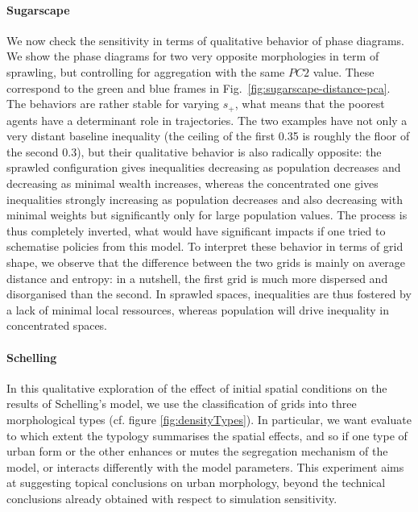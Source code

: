 \documentclass[Royal,sageh,times]{sagej}
\begin{document}
\paragraph{Sugarscape} We now check the sensitivity in terms of qualitative behavior of phase diagrams. We show the phase diagrams for two very opposite morphologies in term of sprawling, but controlling for aggregation with the same $PC2$ value. These correspond to the green and blue frames in Fig.~\ref{fig:sugarscape-distance-pca}. The behaviors are rather stable for varying $s_+$, what means that the poorest agents have a determinant role in trajectories. The two examples have not only a very distant baseline inequality (the ceiling of the first 0.35 is roughly the floor of the second 0.3), but their qualitative behavior is also radically opposite: the sprawled configuration gives inequalities decreasing as population decreases and decreasing as minimal wealth increases, whereas the concentrated one gives inequalities strongly increasing as population decreases and also decreasing with minimal weights but significantly only for large population values. The process is thus completely inverted, what would have significant impacts if one tried to schematise policies from this model. To interpret these behavior in terms of grid shape, we observe that the difference between the two grids is mainly on average distance and entropy: in a nutshell, the first grid is much more dispersed and disorganised than the second. In sprawled spaces, inequalities are thus fostered by a lack of minimal local ressources, whereas population will drive inequality in concentrated spaces.




\paragraph{Schelling} In this qualitative exploration of the effect of initial spatial conditions on the results of Schelling's model, we use the classification of grids into three morphological types (cf. figure \ref{fig:densityTypes}). In particular, we want evaluate to which extent the typology summarises the spatial effects, and so if one type of urban form or the other enhances or mutes the segregation mechanism of the model, or interacts differently with the model parameters. This experiment aims at suggesting topical conclusions on urban morphology, beyond the technical conclusions already obtained with respect to simulation sensitivity.
\end{document}
